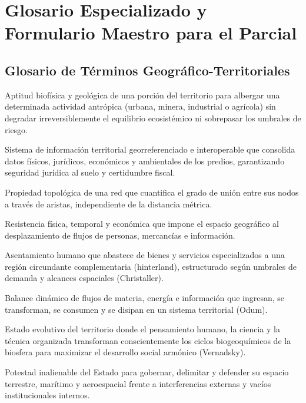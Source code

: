 \documentclass[11pt,a4paper]{article}
\begin{document}
\newpage
\section{Glosario Especializado y Formulario Maestro para el Parcial}

\subsection{Glosario de Términos Geográfico-Territoriales}
\begin{description}[leftmargin=!,labelwidth=4.5cm]
    \item[Capacidad de Acogida:] Aptitud biofísica y geológica de una porción del territorio para albergar una determinada actividad antrópica (urbana, minera, industrial o agrícola) sin degradar irreversiblemente el equilibrio ecosistémico ni sobrepasar los umbrales de riesgo.
    \item[Catastro Multipropósito:] Sistema de información territorial georreferenciado e interoperable que consolida datos físicos, jurídicos, económicos y ambientales de los predios, garantizando seguridad jurídica al suelo y certidumbre fiscal.
    \item[Conectividad:] Propiedad topológica de una red que cuantifica el grado de unión entre sus nodos a través de aristas, independiente de la distancia métrica.
    \item[Fricción de la Distancia:] Resistencia física, temporal y económica que impone el espacio geográfico al desplazamiento de flujos de personas, mercancías e información.
    \item[Lugar Central:] Asentamiento humano que abastece de bienes y servicios especializados a una región circundante complementaria (hinterland), estructurado según umbrales de demanda y alcances espaciales (Christaller).
    \item[Metabolismo Territorial:] Balance dinámico de flujos de materia, energía e información que ingresan, se transforman, se consumen y se disipan en un sistema territorial (Odum).
    \item[Noosfera:] Estado evolutivo del territorio donde el pensamiento humano, la ciencia y la técnica organizada transforman conscientemente los ciclos biogeoquímicos de la biosfera para maximizar el desarrollo social armónico (Vernadsky).
    \item[Soberanía Territorial:] Potestad inalienable del Estado para gobernar, delimitar y defender su espacio terrestre, marítimo y aeroespacial frente a interferencias externas y vacíos institucionales internos.
\end{description}
\end{document}
